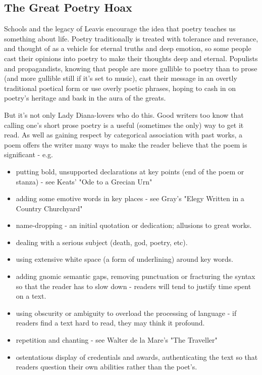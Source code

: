 \documentclass[11pt]{article}
\begin{document}
\newpage\subsection{The Great Poetry Hoax}

Schools and the legacy of Leavis encourage the idea that poetry teaches us something about life. Poetry traditionally is treated with tolerance and reverance, and thought of as a vehicle for eternal truths and deep emotion, so some people cast their opinions into poetry to make their thoughts deep and eternal. Populists and propagandists, knowing that people are more gullible to poetry than to prose (and more gullible still if it's set to music), cast their message in an overtly traditional poetical form or use overly poetic phrases, hoping to cash in on poetry's heritage and bask in the aura of the greats.
 

But it's not only Lady Diana-lovers who do this. Good writers too know that calling one's short prose poetry is a useful (sometimes the only) way to get it read. As well as gaining respect by categorical association with past works, a poem offers the writer many ways to make the reader believe that the poem is significant - e.g.
\begin{itemize}
\item putting bold, unsupported declarations at key points (end of the poem or stanza) - see Keats' "Ode to a Grecian Urn"
\item adding some emotive words in key places - see Gray's "Elegy Written in a Country Churchyard"
\item name-dropping - an initial quotation or dedication; allusions to great works.
\item dealing with a serious subject (death, god, poetry, etc).
\item using extensive white space (a form of underlining) around key words.
\item adding gnomic semantic gaps, removing punctuation or fracturing the syntax so that the reader has to slow down - readers will tend to justify time
spent on a text. 
\item using obscurity or ambiguity to overload the processing of language -
if readers find a text hard to read, they may think it profound.
\item repetition and chanting - see Walter de la Mare's "The Traveller"
\item ostentatious display of credentials and awards, authenticating the text so
that readers question their own abilities rather than the poet's.
\end{itemize}
\end{document}

